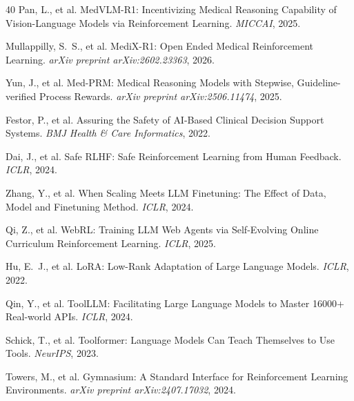 \documentclass{article}
\begin{document}
\begin{thebibliography}{40}
Pan, L., et al.
\newblock MedVLM-R1: Incentivizing Medical Reasoning Capability of Vision-Language Models via Reinforcement Learning.
\newblock \emph{MICCAI}, 2025.

Mullappilly, S.~S., et al.
\newblock MediX-R1: Open Ended Medical Reinforcement Learning.
\newblock \emph{arXiv preprint arXiv:2602.23363}, 2026.


Yun, J., et al.
\newblock Med-PRM: Medical Reasoning Models with Stepwise, Guideline-verified Process Rewards.
\newblock \emph{arXiv preprint arXiv:2506.11474}, 2025.

Festor, P., et al.
\newblock Assuring the Safety of AI-Based Clinical Decision Support Systems.
\newblock \emph{BMJ Health \& Care Informatics}, 2022.

Dai, J., et al.
\newblock Safe RLHF: Safe Reinforcement Learning from Human Feedback.
\newblock \emph{ICLR}, 2024.


Zhang, Y., et al.
\newblock When Scaling Meets LLM Finetuning: The Effect of Data, Model and Finetuning Method.
\newblock \emph{ICLR}, 2024.


Qi, Z., et al.
\newblock WebRL: Training LLM Web Agents via Self-Evolving Online Curriculum Reinforcement Learning.
\newblock \emph{ICLR}, 2025.

Hu, E.~J., et al.
\newblock LoRA: Low-Rank Adaptation of Large Language Models.
\newblock \emph{ICLR}, 2022.

Qin, Y., et al.
\newblock ToolLLM: Facilitating Large Language Models to Master 16000+ Real-world APIs.
\newblock \emph{ICLR}, 2024.

Schick, T., et al.
\newblock Toolformer: Language Models Can Teach Themselves to Use Tools.
\newblock \emph{NeurIPS}, 2023.

Towers, M., et al.
\newblock Gymnasium: A Standard Interface for Reinforcement Learning Environments.
\newblock \emph{arXiv preprint arXiv:2407.17032}, 2024.


\end{thebibliography}
\end{document}
